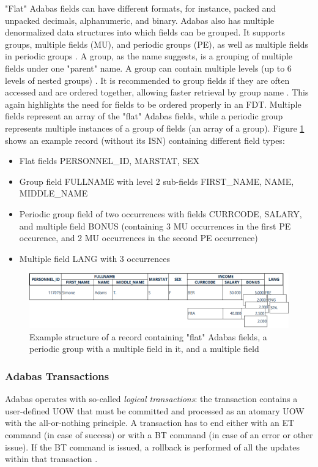 "Flat" Adabas fields can have different formats, for instance, packed and unpacked decimals, alphanumeric, and binary. Adabas also has multiple denormalized data structures into which fields can be grouped. It supports groups, multiple fields (MU), and periodic groups (PE), as well as multiple fields in periodic groups \cite{aebi1996reengineering}. A group, as the name suggests, is a grouping of multiple fields under one "parent" name. A group can contain multiple levels (up to 6 levels of nested groups) \cite{storr1994effizienter}. It is recommended to group fields if they are often accessed and are ordered together, allowing faster retrieval by group name \cite{adabasconcepts}. This again highlights the need for fields to be ordered properly in an \ac{FDT}. Multiple fields represent an array of the "flat" Adabas fields, while a periodic group represents multiple instances of a group of fields (an array of a group). Figure \ref{fig:fundamentals:datastructure} shows an example record (without its \ac{ISN}) containing different field types:
\begin{itemize}
    \item Flat fields PERSONNEL\_ID, MARSTAT, SEX
    \item Group field FULLNAME with level 2 sub-fields FIRST\_NAME, NAME, MIDDLE\_NAME
    \item Periodic group field of two occurrences with fields CURRCODE, SALARY, and multiple field BONUS (containing 3 MU occurrences in the first PE occurence, and 2 MU occurrences in the second PE occurrence)
    \item Multiple field LANG with 3 occurrences
\end{itemize}

\begin{figure}[htbp]
 \centering
 \includegraphics[width=1\textwidth]{chapters/images/datastructures.png}
 \caption{Example structure of a record containing "flat" Adabas fields, a periodic group with a multiple field in it, and a multiple field}
 \label{fig:fundamentals:datastructure}
\end{figure}

\subsubsection{Adabas Transactions}
\label{ch02:fundamentals:adabas:forzos:transactions}
Adabas operates with so-called \textit{logical transactions}: the transaction contains a user-defined \ac{UOW} that must be committed and processed as an atomary \ac{UOW} with the all-or-nothing principle. A transaction has to end either with an \ac{ET} command (in case of success) or with a \ac{BT} command (in case of an error or other issue). If the \ac{BT} command is issued, a rollback is performed of all the updates within that transaction \cite{adabasconcepts}.

